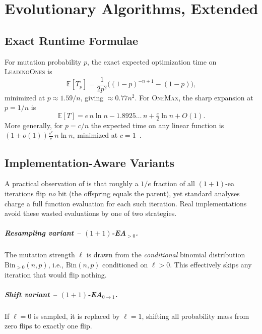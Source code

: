 \chapter{Evolutionary Algorithms, Extended}
\label{app:ea}

\section{Exact Runtime Formulae}
\label{app:sec:exact-runtime}

For mutation probability $p$, the exact expected optimization time on
\textsc{LeadingOnes} is~\cite{bottcher2010optimal}
\[
  \mathbb{E}[T_p] = \frac{1}{2p^2}\bigl((1-p)^{-n+1} - (1-p)\bigr),
\]
minimized at $p \approx 1.59/n$, giving $\approx 0.77n^2$. For
\textsc{OneMax}, the
sharp expansion at $p = 1/n$ is~\cite{hwang2018probabilistic}
\[
  \mathbb{E}[T] = e\,n\ln n - 1.8925\ldots\, n + \tfrac{e}{2}\ln n + O(1).
\]
More generally, for $p = c/n$ the expected time on any linear function is
$(1\pm o(1))\frac{e^c}{c}\,n\ln n$, minimized at $c = 1$~\cite{witt2013tight}.

\section{Implementation-Aware Variants}
\label{app:sec:impl-aware}

A practical observation of \citet{pinto2018practice}
is that roughly a
$1/e$ fraction of all $(1+1)$-\acrshort{ea} iterations flip \emph{no}
bit (the offspring equals
the parent), yet standard analyses charge a full function evaluation
for each such
iteration. Real implementations avoid these wasted evaluations by one
of two strategies.

\paragraph{Resampling variant -- $(1+1)$-\texorpdfstring{EA$_{>0}$}{EA>0}.}
\label{app:par:resampea}
The mutation strength $\ell$ is drawn from the \emph{conditional} binomial
distribution $\mathrm{Bin}_{>0}(n,p)$, i.e., $\mathrm{Bin}(n,p)$ conditioned on
$\ell > 0$. This effectively skips any iteration that would flip nothing.

\paragraph{Shift variant -- $(1+1)$-\texorpdfstring{EA$_{0\to1}$}{EA0to1}.}
\label{app:par:shiftea}
If $\ell = 0$ is sampled, it is replaced by $\ell = 1$, shifting all
probability mass
from zero flips to exactly one flip.


